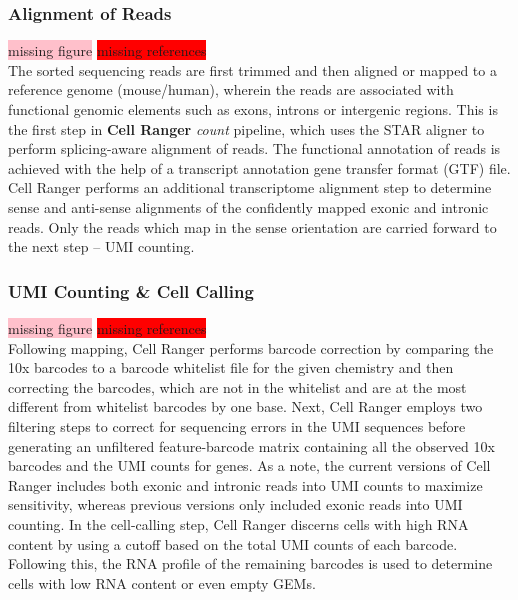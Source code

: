 \subsubsection{Alignment of Reads}
\colorbox{pink}{missing figure} \colorbox{red}{missing references}\\
The sorted sequencing reads are first trimmed and then aligned or mapped to a reference genome (mouse/human), wherein the reads are associated with functional genomic elements such as exons, introns or intergenic regions. This is the first step in \textbf{Cell Ranger} \textit{count} pipeline, which uses the STAR aligner to perform splicing-aware alignment of reads. The functional annotation of reads is achieved with the help of a transcript annotation gene transfer format (GTF) file. Cell Ranger performs an additional transcriptome alignment step to determine sense and anti-sense alignments of the confidently mapped exonic and intronic reads. Only the reads which map in the sense orientation are carried forward to the next step – UMI counting.

\subsubsection{UMI Counting \& Cell Calling}
\colorbox{pink}{missing figure} \colorbox{red}{missing references}\\
Following mapping, Cell Ranger performs barcode correction by comparing the 10x barcodes to a barcode whitelist file for the given chemistry and then correcting the barcodes, which are not in the whitelist and are at the most different from whitelist barcodes by one base. Next, Cell Ranger employs two filtering steps to correct for sequencing errors in the UMI sequences before generating an unfiltered feature-barcode matrix containing all the observed 10x barcodes and the UMI counts for genes. As a note, the current versions of Cell Ranger includes both exonic and intronic reads into UMI counts to maximize sensitivity, whereas previous versions only included exonic reads into UMI counting. In the cell-calling step, Cell Ranger discerns cells with high RNA content by using a cutoff based on the total UMI counts of each barcode. Following this, the RNA profile of the remaining barcodes is used to determine cells with low RNA content or even empty GEMs.

